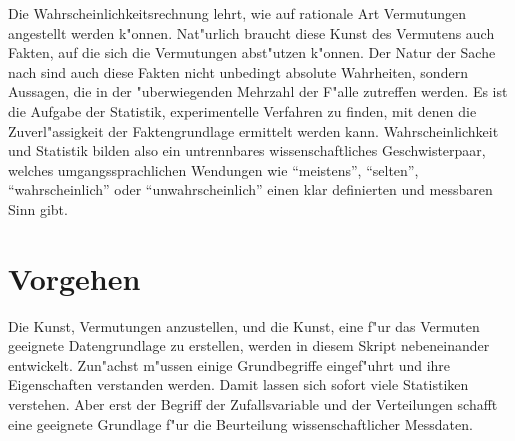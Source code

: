 Die Wahrscheinlichkeitsrechnung lehrt, wie auf rationale
Art Vermutungen angestellt werden k"onnen. Nat"urlich braucht diese
Kunst des Vermutens auch Fakten, auf die sich die Vermutungen
abst"utzen k"onnen. Der Natur der Sache nach sind auch diese
Fakten nicht unbedingt absolute Wahrheiten, sondern Aussagen,
die in der "uberwiegenden Mehrzahl der F"alle zutreffen werden.
Es ist die Aufgabe der Statistik, experimentelle Verfahren zu finden,
mit denen die Zuverl"assigkeit der Faktengrundlage ermittelt
werden kann. Wahrscheinlichkeit und Statistik bilden also ein
untrennbares wissenschaftliches Geschwisterpaar, welches umgangssprachlichen
Wendungen wie ``meistens'', ``selten'', ``wahrscheinlich'' oder  ``unwahrscheinlich''
einen klar definierten und messbaren Sinn gibt.

\section*{Vorgehen}
Die Kunst, Vermutungen anzustellen, und die Kunst, eine f"ur das Vermuten
geeignete Datengrundlage zu erstellen, werden in diesem Skript
nebeneinander entwickelt. Zun"achst m"ussen einige Grundbegriffe eingef"uhrt
und ihre Eigenschaften verstanden werden. Damit lassen sich sofort
viele Statistiken verstehen. Aber erst der Begriff der Zufallsvariable und
der Verteilungen schafft eine
geeignete Grundlage f"ur die Beurteilung wissenschaftlicher Messdaten.

